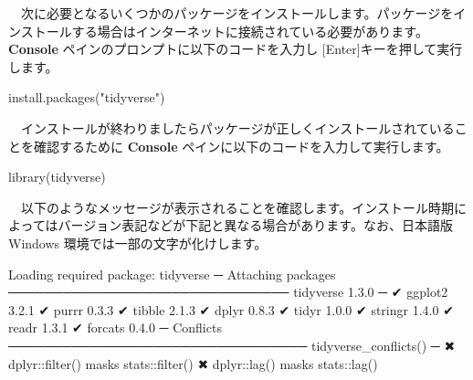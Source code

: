 \documentclass[
  12pt,
]{book}
\newenvironment{Shaded}{\begin{snugshade}}{\end{snugshade}}
\newcommand{\DecValTok}[1]{\textcolor[rgb]{0.00,0.00,0.81}{#1}}
\newcommand{\FloatTok}[1]{\textcolor[rgb]{0.00,0.00,0.81}{#1}}
\newcommand{\FunctionTok}[1]{\textcolor[rgb]{0.00,0.00,0.00}{#1}}
\newcommand{\NormalTok}[1]{#1}
\newcommand{\SpecialCharTok}[1]{\textcolor[rgb]{0.00,0.00,0.00}{#1}}
\newcommand{\StringTok}[1]{\textcolor[rgb]{0.31,0.60,0.02}{#1}}
\begin{document}
　次に必要となるいくつかのパッケージをインストールします。パッケージをインストールする場合はインターネットに接続されている必要があります。 \textbf{Console} ペインのプロンプトに以下のコードを入力し {[}Enter{]}キーを押して実行します。

\begin{Shaded}
\begin{Highlighting}[numbers=left,,]
\FunctionTok{install.packages}\NormalTok{(}\StringTok{"tidyverse"}\NormalTok{)}
\end{Highlighting}
\end{Shaded}

　インストールが終わりましたらパッケージが正しくインストールされていることを確認するために \textbf{Console} ペインに以下のコードを入力して実行します。

\begin{Shaded}
\begin{Highlighting}[numbers=left,,]
\FunctionTok{library}\NormalTok{(tidyverse)}
\end{Highlighting}
\end{Shaded}

　以下のようなメッセージが表示されることを確認します。インストール時期によってはバージョン表記などが下記と異なる場合があります。なお、日本語版 Windows 環境では一部の文字が化けします。

\begin{Shaded}
\begin{Highlighting}[numbers=left,,]
\NormalTok{Loading required package}\SpecialCharTok{:}\NormalTok{ tidyverse}
\NormalTok{─ Attaching packages ─────────────────────────────── tidyverse }\DecValTok{1}\NormalTok{.}\FloatTok{3.0}\NormalTok{ ─}
\NormalTok{✔ ggplot2 }\DecValTok{3}\NormalTok{.}\FloatTok{2.1}\NormalTok{     ✔ purrr   }\DecValTok{0}\NormalTok{.}\FloatTok{3.3}
\NormalTok{✔ tibble  }\DecValTok{2}\NormalTok{.}\FloatTok{1.3}\NormalTok{     ✔ dplyr   }\DecValTok{0}\NormalTok{.}\FloatTok{8.3}
\NormalTok{✔ tidyr   }\DecValTok{1}\NormalTok{.}\FloatTok{0.0}\NormalTok{     ✔ stringr }\DecValTok{1}\NormalTok{.}\FloatTok{4.0}
\NormalTok{✔ readr   }\DecValTok{1}\NormalTok{.}\FloatTok{3.1}\NormalTok{     ✔ forcats }\DecValTok{0}\NormalTok{.}\FloatTok{4.0}
\NormalTok{─ Conflicts ───────────────────────────────── }\FunctionTok{tidyverse\_conflicts}\NormalTok{() ─}
\NormalTok{✖ dplyr}\SpecialCharTok{::}\FunctionTok{filter}\NormalTok{() masks stats}\SpecialCharTok{::}\FunctionTok{filter}\NormalTok{()}
\NormalTok{✖ dplyr}\SpecialCharTok{::}\FunctionTok{lag}\NormalTok{()    masks stats}\SpecialCharTok{::}\FunctionTok{lag}\NormalTok{()}
\end{Highlighting}
\end{Shaded}
\end{document}
